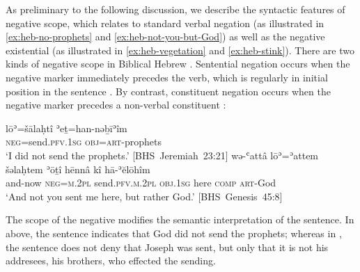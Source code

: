 \documentclass[output=paper,colorlinks,citecolor=brown,draft,draftmode]{langscibook}
\begin{document}
As preliminary to the following discussion, we describe the syntactic
features of negative scope, which relates to standard verbal negation (as
illustrated in \ref{ex:heb-no-prophets} and \ref{ex:heb-not-you-but-God})
as well as the negative existential (as illustrated in
\ref{ex:heb-vegetation} and \ref{ex:heb-stink}). There are two kinds of
negative scope in Biblical Hebrew 
\parencites{SnymanNaude2003}{Snyman2004}{NaudeRendsburg2013}. Sentential negation occurs when the negative
marker immediately precedes the verb, which is regularly in initial
position in the sentence . %
%
By contrast, constituent negation occurs when the negative marker precedes
a non-verbal constituent :
%
\begin{exe}
\ex\label{ex:heb-send-prophets-God}\begin{xlist}
\ex \label{ex:heb-no-prophets}
\gll lōʾ=šālaḥtî ʾeṯ=han-nəḇīʾîm\\
   \textsc{neg}=send.\textsc{pfv.1sg}  \textsc{obj}=\textsc{art}-prophets\\
   \glt `I did not send the prophets.' \mbox{[BHS
   Jeremiah 23:21]}
\ex \label{ex:heb-not-you-but-God}
\gll wə-ʿattâ lōʾ=ʾattem šəlaḥtem ʾōṯî hēnnâ kî hā-ʾĕlōhîm\\
  and-now \textsc{neg}=\textsc{m.2pl} send.\textsc{pfv.m.2pl} \textsc{obj.1sg}
  here   \textsc{comp} \textsc{art}-God\\
\glt `And not you sent me here, but rather God.'
\mbox{[BHS Genesis 45:8]}
  \end{xlist}
  \end{exe}
The scope of the negative modifies the semantic interpretation of the
sentence. In  above, the sentence indicates that
God did not send the prophets; whereas in , the sentence does not deny that Joseph was sent, but only that it is not his addresees, his brothers, who effected the sending.
\end{document}
